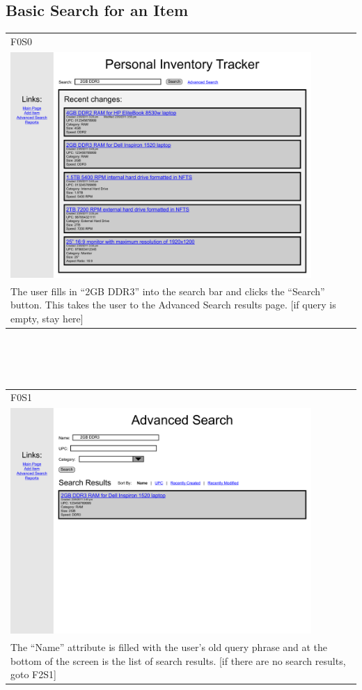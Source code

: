 \documentclass{article}
\begin{document}
\subsection{Basic Search for an Item}
\begin{tabular}{ p{4.5in} }
F0S0\\
\includegraphics[keepaspectratio, width=4.5in]{basicSearchF0S0.pdf} \\
The user fills in ``2GB DDR3'' into the search bar and clicks the ``Search'' button. This takes the user to the Advanced Search results page. [if query is empty, stay here]
\end{tabular}\\
~\\
~\\
\begin{tabular}{ p{4.5in} }
F0S1\\
\includegraphics[keepaspectratio, width=4.5in]{basicSearchF0S1.pdf} \\
The ``Name'' attribute is filled with the user's old query phrase and at the bottom of the screen is the list of search results. [if there are no search results, goto F2S1]
\end{tabular}\\
\end{document}
